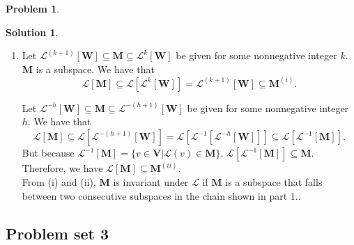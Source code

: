 \documentclass{article}
\theoremstyle{definition}
\newtheorem*{prob*}{Problem}
\newtheorem*{sln*}{Solution}
\newcommand{\V}{\mathbf{V}}
\newcommand{\W}{\mathbf{W}}
\newcommand{\lag}{\mathcal{L}}
\begin{document}
\begin{prob*}
\begin{sln*}
\begin{enumerate}
				
				
				
				
			\item	
			Let $\lag^{(k+1)}[\W] \subseteq \mathbf{M} \subseteq \lag^{k}[\W]$ be given for some nonnegative integer $k$. $\mathbf{M}$ is a subspace. We have that
			$$\lag[\mathbf{M}] \subseteq \lag[\lag^{k}[\W]] = \lag^{(k+1)}[\W] \subseteq \mathbf{M}^{(i)}. $$
			
			Let $\lag^{-h}[\mathbf{W}] \subseteq \mathbf{M} \subseteq \lag^{-(h+1)}[\W]$ be given for some nonnegative integer $h$. We have that
			$$ \lag[\mathbf{M}] \subseteq \lag[\lag^{-(h+1)}[\W]] = \lag[\lag^{-1}[\lag^{-h}[\W]]] \subseteq \lag[\lag^{-1}[\mathbf{M}]].  $$
			But because $\lag^{-1}[\mathbf{M}] = \{ v\in \V \vert \lag(v)\in \mathbf{M} \}$, $\lag[\lag^{-1}[\mathbf{M}]] \subseteq \mathbf{M}$. Therefore, we have $\lag[\mathbf{M}] \subseteq \mathbf{M}^{(ii)}$.\\ 
			
			From (i) and (ii), $\mathbf{M}$ is invariant under $\lag$ if $\mathbf{M}$ is a subspace that falls between two consecutive subspaces in the chain shown in part 1.. 
			
		\end{enumerate}
	\end{sln*}
\end{prob*}







\newpage
\subsection{Problem set 3}
\end{document}
